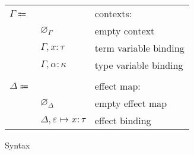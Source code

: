 \documentclass[12pt]{article}
\newcommand\anno[2]{#1 : #2}
\newcommand\evar{x}
\newcommand\type{\tau}
\newcommand\tvar{\alpha}
\newcommand\kind{\kappa}
\newcommand\context{\Gamma}
\newcommand\cempty{\varnothing_{\context}}
\newcommand\cextend[2]{#1, #2}
\newcommand\effect{\varepsilon}
\newcommand\effectmap{\Delta}
\newcommand\emempty{\varnothing_{\effectmap}}
\newcommand\emmap[2]{#1 \mapsto #2}
\newcommand\emextend[2]{#1, #2}
\begin{document}
\begin{figure}
\begin{mdframed}[backgroundcolor=none]
\begin{center}
\begin{tabular}{l l l}
          $\context \Coloneqq$ & & contexts: \\
          & $\cempty$ & empty context \\
          & $\cextend{\context}{\anno{\evar}{\type}}$ & term variable binding \\
          & $\cextend{\context}{\anno{\tvar}{\kind}}$ & type variable binding \\
          \\
          $\effectmap \Coloneqq$ & & effect map: \\
          & $\emempty$ & empty effect map \\
          & $\emextend{\effectmap}{\emmap{\effect}{\anno{\evar}{\type}}}$ & effect binding \\
        \end{tabular}
      \end{center}

      \caption{Syntax}\label{fig:syntax}
    \end{mdframed}
  \end{figure}
\end{document}
